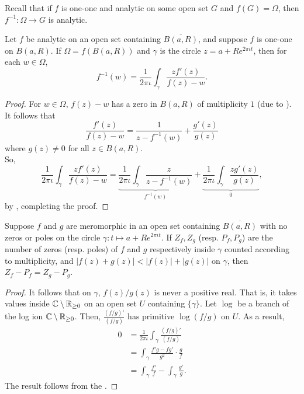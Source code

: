 	Recall that if $f$ is one-one and analytic on some open set $G$ and $f(G) = \Omega$, then $f^{-1} : \Omega \to G$ is analytic.


	\begin{prop}
		Let $f$ be analytic on an open set containing $\overline{B(a,R)}$, and suppose $f$ is one-one on $B(a,R)$. If $\Omega = f(B(a,R))$ and $\gamma$ is the circle $z = a+Re^{2\pi\iota t}$, then for each $w \in \Omega$,
		\[ f^{-1}(w) = \frac{1}{2\pi\iota} \int_{\gamma} \frac{zf'(z)}{f(z)-w}. \]
	\end{prop}
	\begin{proof}
		For $w \in \Omega$, $f(z) - w$ has a zero in $B(a,R)$ of multiplicity $1$ (due to ). It follows that
		\[ \frac{f'(z)}{f(z)-w} = \frac{1}{z-f^{-1}(w)} + \frac{g'(z)}{g(z)} \]
		where $g(z) \ne 0$ for all $z \in B(a,R)$.\\
		So,
		\[ \frac{1}{2\pi\iota} \int_{\gamma} \frac{zf'(z)}{f(z)-w} = \underbrace{\frac{1}{2\pi\iota}\int_{\gamma} \frac{z}{z-f^{-1}(w)}}_{f^{-1}(w)} + \underbrace{\frac{1}{2\pi\iota} \int_{\gamma} \frac{zg'(z)}{g(z)}}_{0}, \]
		by , completing the proof.
	\end{proof}


	\begin{ftheo}
		Suppose $f$ and $g$ are meromorphic in an open set containing $\overline{B(a,R)}$ with no zeros or poles on the circle $\gamma: t \mapsto a+Re^{2\pi\iota t}$. If $Z_f,Z_g$ (resp. $P_f,P_g$) are the number of zeros (resp. poles) of $f$ and $g$ respectively inside $\gamma$ counted according to multiplicity, and  $|f(z) + g(z)| < |f(z)| + |g(z)|$ on $\gamma$, then $Z_f - P_f = Z_g - P_g$.
	\end{ftheo}
	\begin{proof}
		It follows that on $\gamma$, $f(z)/g(z)$ is never a positive real. That is, it takes values inside $\mathbb{C} \setminus \mathbb{R}_{\ge 0}$ on an open set $U$ containing $\{\gamma\}$. Let $\log$ be a branch of the log ion $\mathbb{C} \setminus \mathbb{R}_{\ge 0}$. Then, $\frac{(f/g)'}{(f/g)}$ has primitive $\log(f/g)$ on $U$. As a result,
		\begin{align*}
			0 &= \frac{1}{2\pi\iota} \int_{\gamma} \frac{(f/g)'}{(f/g)} \\
				&= \int_{\gamma} \frac{f'g - fg'}{g^2} \cdot \frac{g}{f} \\
				&= \int_{\gamma} \frac{f'}{f} - \int_{\gamma} \frac{g'}{g}.
		\end{align*} 
		The result follows from the .
	\end{proof}